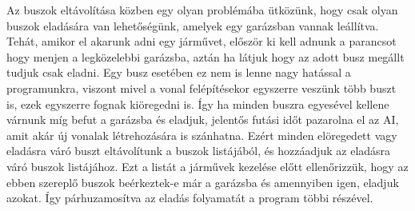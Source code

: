Az buszok eltávolítása közben egy olyan problémába ütközünk, hogy csak olyan buszok eladására van lehetőségünk, amelyek egy garázsban vannak leállítva. Tehát, amikor el akarunk adni egy járművet, először ki kell adnunk a parancsot hogy menjen a legközelebbi garázsba, aztán ha látjuk hogy az adott busz megállt tudjuk csak eladni. Egy busz esetében ez nem is lenne nagy hatással a programunkra, viszont mivel a vonal felépítésekor egyszerre veszünk több buszt is, ezek egyszerre fognak kiöregedni is. Így ha minden buszra egyesével kellene várnunk míg befut a garázsba és eladjuk, jelentős futási időt pazarolna el az AI, amit akár új vonalak létrehozására is szánhatna. Ezért minden elöregedett vagy eladásra váró buszt eltávolítunk a buszok listájából, és hozzáadjuk az eladásra váró buszok listájához. Ezt a listát a járművek kezelése előtt ellenőrizzük, hogy az ebben szereplő buszok beérkeztek-e már a garázsba és amennyiben igen, eladjuk azokat. Így párhuzamosítva az eladás folyamatát a program többi részével.
